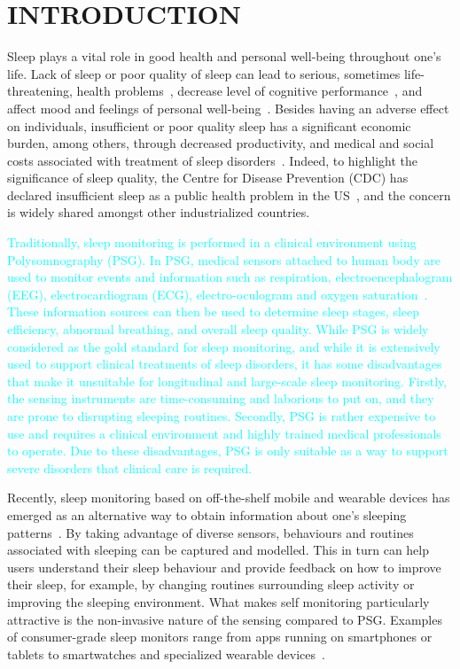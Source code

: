 \section{INTRODUCTION}\label{sec:1introduction}

Sleep plays a vital role in good health and personal well-being throughout one's life. Lack of sleep or poor quality of sleep can lead to
serious, sometimes life-threatening, health problems~\cite{altena2008sleep,chandola2010effect,lallukka2016contribution}, decrease level of
cognitive performance~\cite{alhola07sleep,akerstedt07altered}, and affect mood and feelings of personal
well-being~\cite{paunio09longitudinal,pilcher97sleep}. Besides having an adverse effect on individuals, insufficient or poor quality sleep
has a significant economic burden, among others, through decreased productivity, and medical and social costs associated with treatment of
sleep disorders~\cite{hafner17why}. Indeed, to highlight the significance of sleep quality, the Centre for Disease Prevention (CDC) has
declared insufficient sleep as a public health problem in the US~\cite{sleepreport}, and the concern is widely shared amongst other
industrialized countries.

\textcolor{cyan} {Traditionally, sleep monitoring is performed in a clinical environment using Polysomnography (PSG). In PSG, medical
sensors attached to human body are used to monitor events and information such as respiration, electroencephalogram (EEG),
electrocardiogram (ECG), electro-oculogram and oxygen
saturation~\cite{ebrahimi2008automatic,saper2005hypothalamic,oropesa1999sleep,langkvist2012sleep}. These information sources can then be
used to determine sleep stages, sleep efficiency, abnormal breathing, and overall sleep quality. While PSG is widely considered as the gold
standard for sleep monitoring, and while it is extensively used to support clinical treatments of sleep disorders, it has some
disadvantages that make it unsuitable for longitudinal and large-scale sleep monitoring. Firstly, the sensing instruments are
time-consuming and laborious to put on, and they are prone to disrupting sleeping routines.  Secondly, PSG is rather expensive to use and
requires a clinical environment and highly trained medical professionals to operate. Due to these disadvantages, PSG is only suitable as a
way to support severe disorders that clinical care is required.}


Recently, sleep monitoring based on off-the-shelf mobile and wearable devices has emerged as an alternative way to obtain information about
one's sleeping patterns~\cite{ko15consumer,shelgikar2016sleep}. By taking advantage of diverse sensors, behaviours and routines associated
with sleeping can be captured and modelled. This in turn can help users understand their sleep behaviour and provide feedback on how to
improve their sleep, for example, by changing routines surrounding sleep activity or improving the sleeping environment. What makes self
monitoring particularly attractive is the non-invasive nature of the sensing compared to PSG. Examples of consumer-grade sleep monitors
range from apps running on smartphones or tablets to smartwatches and specialized wearable
devices~\cite{zeo,Jawbone,SleepAndroid,fitbit,gu2016sleep,sleepmonitor}.

